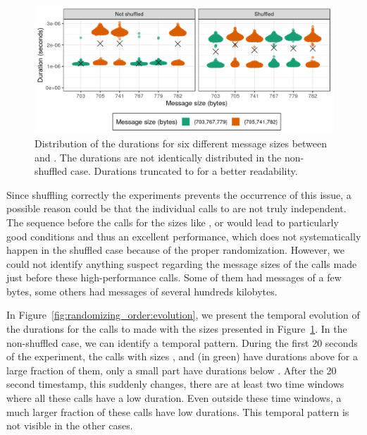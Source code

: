         \begin{figure}[htpb]
            \centering
            \includegraphics[width=\linewidth]{img/experiment/randomizing_order/distribution.png}
            \caption{Distribution of the \recv durations for six different message sizes between  and
            .  The durations are not identically distributed in the non-shuffled case.  Durations
            truncated to  for a better readability.}%
            \label{fig:randomizing_order:distribution}
        \end{figure}

        Since shuffling correctly the experiments prevents the occurrence of this issue, a possible reason could be that
        the individual calls to \recv are not truly independent. The sequence before the calls for the sizes like
        ,  or  would lead to particularly good conditions and thus an
        excellent performance, which does not systematically happen in the shuffled case because of the proper
        randomization. However, we could not identify anything suspect regarding the message sizes of the calls made
        just before these high-performance calls. Some of them had messages of a few bytes, some others had messages of
        several hundreds kilobytes.

        In Figure~\ref{fig:randomizing_order:evolution}, we present the temporal evolution of the durations for the
        calls to \recv made with the sizes presented in Figure~\ref{fig:randomizing_order:distribution}. In the
        non-shuffled case, we can identify a temporal pattern. During the first 20 seconds of the experiment, the
        calls with sizes ,  and  (in green) have durations above
         for a large fraction of them, only a small part have durations below
        . After the 20 second timestamp, this suddenly changes, there are at least two time
        windows where all these calls have a low duration. Even outside these time windows, a much larger fraction of
        these calls have low durations. This temporal pattern is not visible in the other cases.

